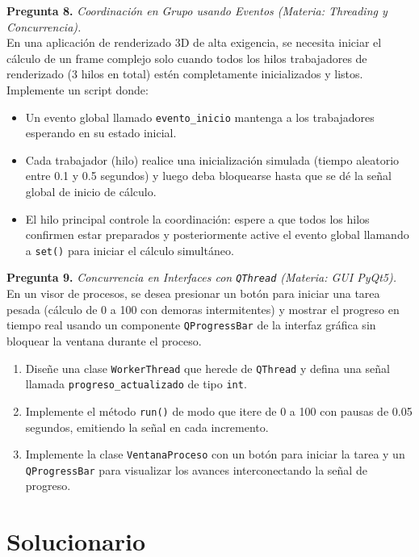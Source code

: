 \documentclass[12pt,letterpaper]{article}
\begin{document}
\textbf{Pregunta 8.} \textit{Coordinación en Grupo usando Eventos (Materia: Threading y Concurrencia).} \\
En una aplicación de renderizado 3D de alta exigencia, se necesita iniciar el cálculo de un frame complejo solo cuando todos los hilos trabajadores de renderizado (3 hilos en total) estén completamente inicializados y listos.
Implemente un script donde:
\begin{itemize}
  \item Un evento global llamado \texttt{evento\_inicio} mantenga a los trabajadores esperando en su estado inicial.
  \item Cada trabajador (hilo) realice una inicialización simulada (tiempo aleatorio entre 0.1 y 0.5 segundos) y luego deba bloquearse hasta que se dé la señal global de inicio de cálculo.
  \item El hilo principal controle la coordinación: espere a que todos los hilos confirmen estar preparados y posteriormente active el evento global llamando a \texttt{set()} para iniciar el cálculo simultáneo.
\end{itemize}

\bigskip

\textbf{Pregunta 9.} \textit{Concurrencia en Interfaces con \texttt{QThread} (Materia: GUI PyQt5).} \\
En un visor de procesos, se desea presionar un botón para iniciar una tarea pesada (cálculo de 0 a 100 con demoras intermitentes) y mostrar el progreso en tiempo real usando un componente \texttt{QProgressBar} de la interfaz gráfica sin bloquear la ventana durante el proceso.
\begin{enumerate}[label=\alph*)]
  \item Diseñe una clase \texttt{WorkerThread} que herede de \texttt{QThread} y defina una señal llamada \texttt{progreso\_actualizado} de tipo \texttt{int}.
  \item Implemente el método \texttt{run()} de modo que itere de 0 a 100 con pausas de 0.05 segundos, emitiendo la señal en cada incremento.
  \item Implemente la clase \texttt{VentanaProceso} con un botón para iniciar la tarea y un \texttt{QProgressBar} para visualizar los avances interconectando la señal de progreso.
\end{enumerate}

\pagebreak

\section*{Solucionario}
\end{document}
